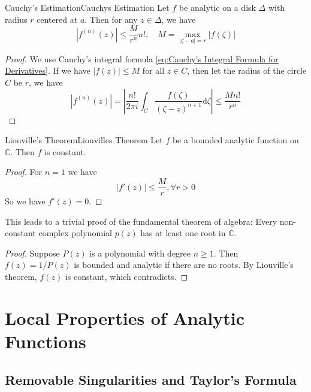 \documentclass[../main.tex]{subfiles}
\begin{document}
\begin{theorem}{Cauchy's Estimation}{Cauchys Estimation}
	Let $f$ be analytic on a disk $\Delta$ with radius $r$ centered at $a$. Then for any $z\in \Delta$, we have
	\begin{equation}
		\left|f^{(n)}(z)\right| \leq \frac{M}{r^n} n!, \quad M = \max_{\left|\zeta-a\right|=r} \left|f(\zeta)\right|
	\end{equation}
\end{theorem}
\begin{proof}
We use Cauchy's integral formula \ref{eq:Cauchy's Integral Formula for Derivatives}. If we have $\left|f(z)\right|\leq M$ for all $z\in C$, then let the radius of the circle $C$ be $r$, we have
	\begin{equation}
		\left|f^{(n)}(z)\right| = \left|\frac{n!}{2 \pi i} \int_C \frac{f(\zeta)}{(\zeta - z)^{n+1}} \mathrm{d} \zeta\right| \leq \frac{M n!}{r^n}
	\end{equation}
\end{proof}

\begin{theorem}{Liouville's Theorem}{Liouvilles Theorem}
	Let $f$ be a bounded analytic function on $\mathbb{C}$. Then $f$ is constant.
\end{theorem}
\begin{proof}
	For $n=1$ we have 
	\begin{equation*}
		\left|f'(z)\right| \leq \frac{M}{r}, \forall r>0
	\end{equation*}
	So we have $f'(z)=0$.
\end{proof}
This leads to a trivial proof of the fundamental theorem of algebra: Every non-constant complex polynomial $p(z)$ has at least one root in $\mathbb{C}$.
\begin{proof}
	Suppose $P(z)$ is a polynomial with degree $n\geq 1$. Then $f(z) = 1 / P(z)$ is bounded and analytic if there are no roots. By Liouville's theorem, $f(z)$ is constant, which contradicts.
\end{proof}

\section{Local Properties of Analytic Functions}

\subsection{Removable Singularities and Taylor's Formula}
\end{document}
